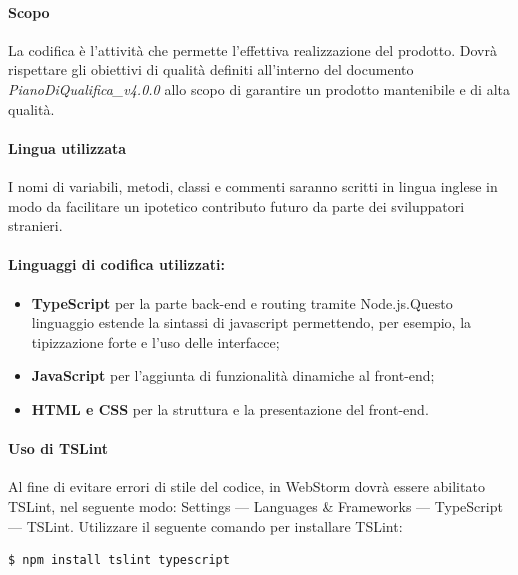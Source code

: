 \documentclass[11pt,a4paper]{article}
\begin{document}
{	\paragraph{Scopo}
	La codifica è l'attività che permette l'effettiva realizzazione del prodotto.
	Dovrà rispettare gli obiettivi di qualità definiti all'interno del documento \textit{PianoDiQualifica\_v4.0.0} allo scopo di garantire un prodotto mantenibile e di alta qualità.
		
	\paragraph{Lingua utilizzata}
 
	I nomi di variabili, metodi, classi e commenti saranno scritti in lingua inglese in modo da facilitare un ipotetico contributo futuro da parte dei sviluppatori stranieri.
	
	\paragraph{Linguaggi di codifica utilizzati:}
	\begin{itemize}
		\item \textbf{TypeScript} per la parte back-end e routing tramite Node.js.Questo linguaggio estende la sintassi di javascript permettendo, per esempio, la tipizzazione forte e l'uso delle interfacce;
		\item \textbf{JavaScript} per l'aggiunta di funzionalità dinamiche al front-end;
		\item \textbf{HTML e CSS} per la struttura e la presentazione del front-end.
	\end{itemize}
	
	\paragraph{Uso di TSLint}
	Al fine di evitare errori di stile del codice, in WebStorm dovrà essere abilitato TSLint, nel seguente modo: Settings — Languages \& Frameworks — TypeScript — TSLint. Utilizzare il seguente comando per installare TSLint:
	
	\begin{center}
		\begin{minipage}{.5\textwidth}
		\begin{lstlisting}[caption=Installazione di TSLint,numbers=none]
			$ npm install tslint typescript
		\end{lstlisting}
	\end{minipage}
	\end{center}
	
}
\end{document}
